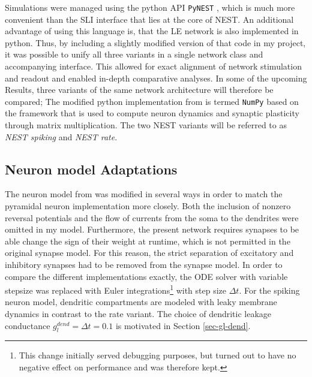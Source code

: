 Simulations were managed using the python API \texttt{PyNEST} \citep{Eppler2009}, which is much more convenient than the
SLI interface that lies at the core of NEST. An additional advantage of using this language is, that the LE network  is
also implemented in python. Thus, by including a slightly modified version of that code in my project, it was possible
to unify all three variants in a single network class and accompanying interface. This allowed for exact alignment of
network stimulation and readout and enabled in-depth comparative analyses. In some of the upcoming Results, three
variants of the same network architecture will therefore be compared; The modified python implementation from
\citep{Haider2021} is termed \texttt{NumPy} based on the framework that is used to compute neuron dynamics and synaptic
plasticity through matrix multiplication. The two NEST variants will be referred to as \textit{NEST spiking} and
\textit{NEST rate}.

\subsection{Neuron model Adaptations}

The neuron model from \citep{Stapmanns2021} was modified in several ways in order to match the pyramidal neuron
implementation more closely. Both the inclusion of nonzero reversal potentials and the flow of currents from the soma to
the dendrites were omitted in my model. Furthermore, the present network requires synapses to be able change the sign of
their weight at runtime, which is not permitted in the original synapse model. For this reason, the strict separation of
excitatory and inhibitory synapses had to be removed from the synapse model. In order to compare the different
implementations exactly, the ODE solver with variable stepsize was replaced with Euler integrations\footnote{This change
initially served debugging purposes, but turned out to have no negative effect on performance and was therefore kept.}
with step size $\Delta t$. For the spiking neuron model, dendritic compartments are modeled with leaky membrane dynamics
in contrast to the rate variant. The choice of dendritic leakage conductance $g_l^{dend}=\Delta t=0.1$ is motivated in
Section \ref{sec-gl-dend}.

